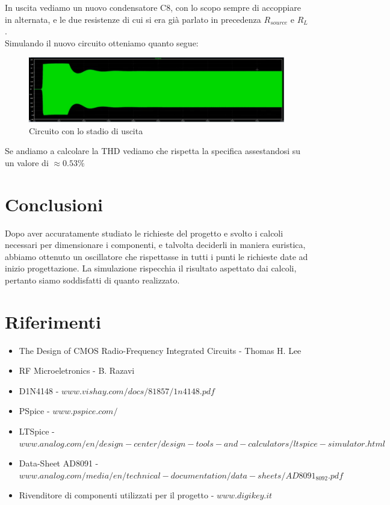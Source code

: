 \documentclass{article}
\begin{document}
In uscita vediamo un nuovo condensatore C8, con lo scopo sempre di accoppiare in alternata, e le due resistenze di cui si era già parlato in precedenza $R_{source}$ e $R_{L}$.\\Simulando il nuovo circuito otteniamo quanto segue:
~\begin{figure}[H]
\includegraphics[width=\textwidth]{SimulazioneFinaleTempo}
\centering
\caption{Circuito con lo stadio di uscita}
\label{fig:foo}
\end{figure}
Se andiamo a calcolare la THD vediamo che rispetta la specifica assestandosi su un valore di $ \approx 0.53\% $
\newpage

\section{Conclusioni}
Dopo aver accuratamente studiato le richieste del progetto e svolto i calcoli necessari per dimensionare i componenti, e talvolta deciderli in maniera euristica, abbiamo ottenuto un oscillatore che rispettasse in tutti i punti le richieste date ad inizio progettazione.
La simulazione rispecchia il risultato aspettato dai calcoli, pertanto siamo soddisfatti di quanto realizzato.
\section{Riferimenti}

\begin{itemize}
\item The Design of CMOS Radio-Frequency Integrated Circuits - Thomas H. Lee
\item RF Microeletronics - B. Razavi
\item D1N4148 - $www.vishay.com/docs/81857/1n4148.pdf$
\item PSpice - $www.pspice.com/$
\item LTSpice - $www.analog.com/en/design-center/design-tools-and-calculators/ltspice-simulator.html$
\item Data-Sheet AD8091 - $www.analog.com/media/en/technical-documentation/data-sheets/AD8091_8092.pdf$
\item Rivenditore di componenti utilizzati per il progetto - $www.digikey.it$
\end{itemize}
\end{document}
